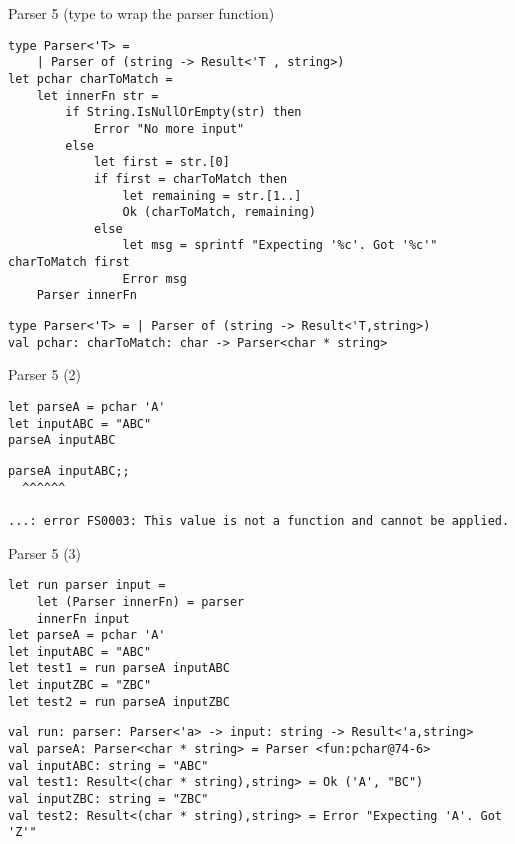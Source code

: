 \documentclass[t]{beamer}
\begin{document}
\begin{frame}[label={sec:orga7e56d5},fragile]{Parser 5 (type to wrap the parser function)}
 \begin{verbatim}
type Parser<'T> =
    | Parser of (string -> Result<'T , string>)
let pchar charToMatch = 
    let innerFn str =
        if String.IsNullOrEmpty(str) then
            Error "No more input"
        else
            let first = str.[0] 
            if first = charToMatch then
                let remaining = str.[1..]
                Ok (charToMatch, remaining)
            else
                let msg = sprintf "Expecting '%c'. Got '%c'" charToMatch first
                Error msg
    Parser innerFn
\end{verbatim}

\begin{verbatim}
type Parser<'T> = | Parser of (string -> Result<'T,string>)
val pchar: charToMatch: char -> Parser<char * string>
\end{verbatim}
\end{frame}

\begin{frame}[label={sec:orgb7ce182},fragile]{Parser 5 (2)}
 \begin{verbatim}
let parseA = pchar 'A'
let inputABC = "ABC"
parseA inputABC
\end{verbatim}

\begin{verbatim}
parseA inputABC;;
  ^^^^^^

...: error FS0003: This value is not a function and cannot be applied.
\end{verbatim}
\end{frame}


\begin{frame}[label={sec:org732898b},fragile]{Parser 5 (3)}
 \begin{verbatim}
let run parser input = 
    let (Parser innerFn) = parser 
    innerFn input
let parseA = pchar 'A' 
let inputABC = "ABC"
let test1 = run parseA inputABC
let inputZBC = "ZBC"
let test2 = run parseA inputZBC
\end{verbatim}

\begin{verbatim}
val run: parser: Parser<'a> -> input: string -> Result<'a,string>
val parseA: Parser<char * string> = Parser <fun:pchar@74-6>
val inputABC: string = "ABC"
val test1: Result<(char * string),string> = Ok ('A', "BC")
val inputZBC: string = "ZBC"
val test2: Result<(char * string),string> = Error "Expecting 'A'. Got 'Z'"
\end{verbatim}
\end{frame}
\end{document}
